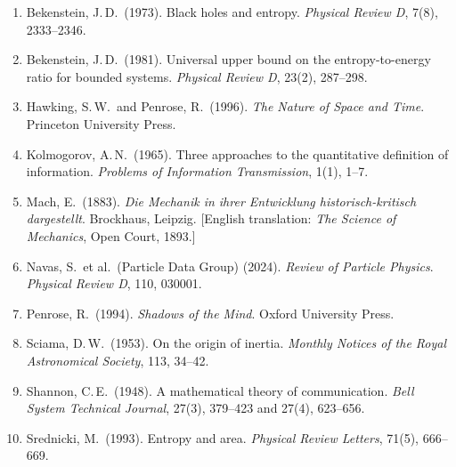 \documentclass[12pt]{article}
\begin{document}
\begin{enumerate}

  \item\label{Bekenstein1973}
        Bekenstein, J.\,D.\ (1973).
        Black holes and entropy.
        \textit{Physical Review D}, 7(8), 2333--2346.

  \item\label{Bekenstein1981}
        Bekenstein, J.\,D.\ (1981).
        Universal upper bound on the entropy-to-energy ratio for
        bounded systems.
        \textit{Physical Review D}, 23(2), 287--298.

  \item\label{HawkingPenrose1996}
        Hawking, S.\,W.\ and Penrose, R.\ (1996).
        \textit{The Nature of Space and Time}.
        Princeton University Press.

  \item\label{Kolmogorov1965}
        Kolmogorov, A.\,N.\ (1965).
        Three approaches to the quantitative definition of information.
        \textit{Problems of Information Transmission}, 1(1), 1--7.

  \item\label{Mach1883}
        Mach, E.\ (1883).
        \textit{Die Mechanik in ihrer Entwicklung historisch-kritisch
        dargestellt}.
        Brockhaus, Leipzig.
        [English translation: \textit{The Science of Mechanics},
        Open Court, 1893.]

  \item\label{PDG2024}
        Navas, S.\ et al.\ (Particle Data Group) (2024).
        \textit{Review of Particle Physics}.
        \textit{Physical Review D}, 110, 030001.

  \item\label{Penrose1994}
        Penrose, R.\ (1994).
        \textit{Shadows of the Mind}.
        Oxford University Press.

  \item\label{Sciama1953}
        Sciama, D.\,W.\ (1953).
        On the origin of inertia.
        \textit{Monthly Notices of the Royal Astronomical Society},
        113, 34--42.

  \item\label{Shannon1948}
        Shannon, C.\,E.\ (1948).
        A mathematical theory of communication.
        \textit{Bell System Technical Journal},
        27(3), 379--423 and 27(4), 623--656.

  \item\label{Srednicki1993}
        Srednicki, M.\ (1993).
        Entropy and area.
        \textit{Physical Review Letters}, 71(5), 666--669.


\end{enumerate}
\end{document}
